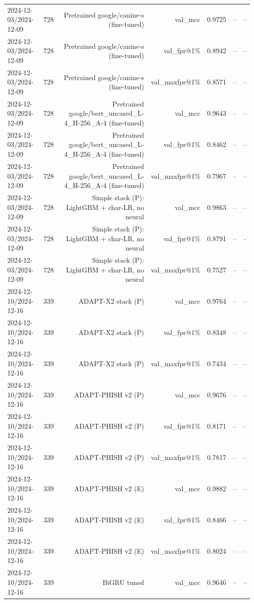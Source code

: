 \begin{table}[t]
\begin{tabular}{llrrrrr}
2024-12-03/2024-12-09 & 728 & Pretrained google/canine-s (fine-tuned) & val\_mcc & 0.9725 & -- & -- \\
2024-12-03/2024-12-09 & 728 & Pretrained google/canine-s (fine-tuned) & val\_fpr@1\% & 0.8942 & -- & -- \\
2024-12-03/2024-12-09 & 728 & Pretrained google/canine-s (fine-tuned) & val\_maxfpr@1\% & 0.8571 & -- & -- \\
2024-12-03/2024-12-09 & 728 & Pretrained google/bert\_uncased\_L-4\_H-256\_A-4 (fine-tuned) & val\_mcc & 0.9643 & -- & -- \\
2024-12-03/2024-12-09 & 728 & Pretrained google/bert\_uncased\_L-4\_H-256\_A-4 (fine-tuned) & val\_fpr@1\% & 0.8462 & -- & -- \\
2024-12-03/2024-12-09 & 728 & Pretrained google/bert\_uncased\_L-4\_H-256\_A-4 (fine-tuned) & val\_maxfpr@1\% & 0.7967 & -- & -- \\
2024-12-03/2024-12-09 & 728 & Simple stack (P): LightGBM + char-LR, no neural & val\_mcc & 0.9863 & -- & -- \\
2024-12-03/2024-12-09 & 728 & Simple stack (P): LightGBM + char-LR, no neural & val\_fpr@1\% & 0.8791 & -- & -- \\
2024-12-03/2024-12-09 & 728 & Simple stack (P): LightGBM + char-LR, no neural & val\_maxfpr@1\% & 0.7527 & -- & -- \\
2024-12-10/2024-12-16 & 339 & ADAPT-X2 stack (P) & val\_mcc & 0.9764 & -- & -- \\
2024-12-10/2024-12-16 & 339 & ADAPT-X2 stack (P) & val\_fpr@1\% & 0.8348 & -- & -- \\
2024-12-10/2024-12-16 & 339 & ADAPT-X2 stack (P) & val\_maxfpr@1\% & 0.7434 & -- & -- \\
2024-12-10/2024-12-16 & 339 & ADAPT-PHISH v2 (P) & val\_mcc & 0.9676 & -- & -- \\
2024-12-10/2024-12-16 & 339 & ADAPT-PHISH v2 (P) & val\_fpr@1\% & 0.8171 & -- & -- \\
2024-12-10/2024-12-16 & 339 & ADAPT-PHISH v2 (P) & val\_maxfpr@1\% & 0.7817 & -- & -- \\
2024-12-10/2024-12-16 & 339 & ADAPT-PHISH v2 (E) & val\_mcc & 0.9882 & -- & -- \\
2024-12-10/2024-12-16 & 339 & ADAPT-PHISH v2 (E) & val\_fpr@1\% & 0.8466 & -- & -- \\
2024-12-10/2024-12-16 & 339 & ADAPT-PHISH v2 (E) & val\_maxfpr@1\% & 0.8024 & -- & -- \\
2024-12-10/2024-12-16 & 339 & BiGRU tuned & val\_mcc & 0.9646 & -- & -- \\

\end{tabular}
\end{table}
